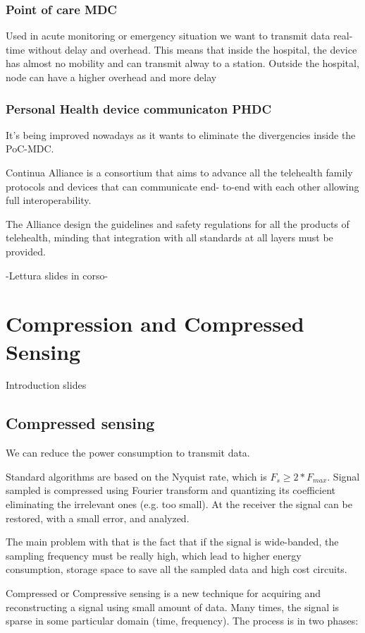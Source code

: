 \subsubsection{Point of care MDC}
Used in acute monitoring or emergency situation we want to transmit data real-time without delay and overhead. This means that inside the hospital, the device has almost no mobility and can transmit alway to a station. Outside the hospital, node can have a higher overhead and more delay

\subsubsection{Personal Health device communicaton PHDC}
It's being improved nowadays as it wants to eliminate the divergencies inside the PoC-MDC.

Continua Alliance is a consortium that aims to advance all the telehealth family protocols and devices that can communicate end- to-end with each other allowing full interoperability.

The Alliance design the guidelines and safety regulations for all the products of telehealth, minding that integration with all standards at all layers must be provided.

-Lettura slides in corso-


\section{Compression and Compressed Sensing}
Introduction slides

\subsection{Compressed sensing}
We can reduce the power consumption to transmit data.

Standard algorithms are based on the Nyquist rate, which is $F_s \ge 2* F_{max}$. Signal sampled is compressed using Fourier transform and quantizing its coefficient eliminating the irrelevant ones (e.g. too small). At the receiver the signal can be restored, with a small error, and analyzed.

The main problem with that is the fact that if the signal is wide-banded, the sampling frequency must be really high, which lead to higher energy consumption, storage space to save all the sampled data and high cost circuits.

Compressed or Compressive sensing is a new technique for acquiring and reconstructing a signal using small amount of data. Many times, the signal is sparse in some particular domain (time, frequency). The process is in two phases:

